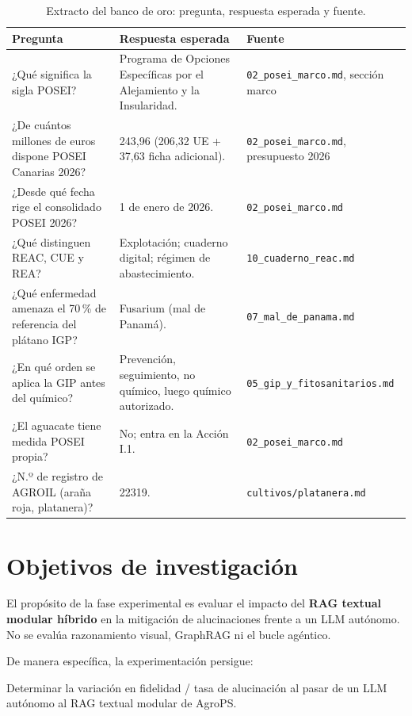 \begin{table}[htbp]
\centering
\caption{Extracto del banco de oro: pregunta, respuesta esperada y fuente.}
\label{tab:banco-muestra}
\small
\begin{tabular}{p{4.2cm}p{4.6cm}p{4.8cm}}
\toprule
\textbf{Pregunta} & \textbf{Respuesta esperada} & \textbf{Fuente} \\
\midrule
¿Qué significa la sigla POSEI? & Programa de Opciones Específicas por el Alejamiento y la Insularidad. & \texttt{02\_posei\_marco.md}, sección marco \\
¿De cuántos millones de euros dispone POSEI Canarias 2026? & 243,96 (206,32 UE + 37,63 ficha adicional). & \texttt{02\_posei\_marco.md}, presupuesto 2026 \\
¿Desde qué fecha rige el consolidado POSEI 2026? & 1 de enero de 2026. & \texttt{02\_posei\_marco.md} \\
¿Qué distinguen REAC, CUE y REA? & Explotación; cuaderno digital; régimen de abastecimiento. & \texttt{10\_cuaderno\_reac.md} \\
¿Qué enfermedad amenaza el 70\,\% de referencia del plátano IGP? & Fusarium (mal de Panamá). & \texttt{07\_mal\_de\_panama.md} \\
¿En qué orden se aplica la GIP antes del químico? & Prevención, seguimiento, no químico, luego químico autorizado. & \texttt{05\_gip\_y\_fitosanitarios.md} \\
¿El aguacate tiene medida POSEI propia? & No; entra en la Acción I.1. & \texttt{02\_posei\_marco.md} \\
¿N.º de registro de AGROIL (araña roja, platanera)? & 22319. & \texttt{cultivos/platanera.md} \\
\bottomrule
\end{tabular}
\end{table}

\section{Objetivos de investigación}
El propósito de la fase experimental es evaluar el impacto del \textbf{RAG textual modular híbrido} en la mitigación de alucinaciones frente a un LLM autónomo. No se evalúa razonamiento visual, GraphRAG ni el bucle agéntico.

De manera específica, la experimentación persigue:

Determinar la variación en fidelidad / tasa de alucinación al pasar de un LLM autónomo al RAG textual modular de AgroPS.

